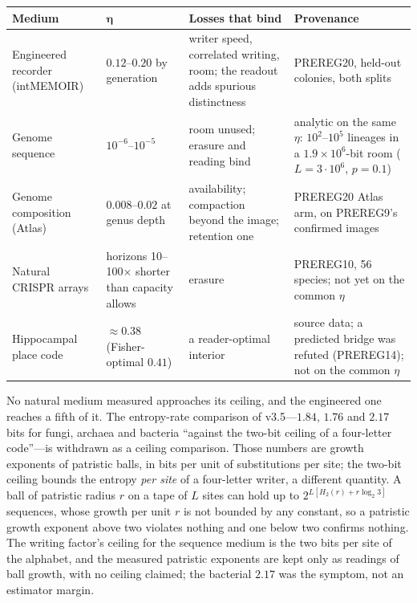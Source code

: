 \documentclass[11pt]{article}
\begin{document}
\begin{center}\small
\begin{tabular}{@{}>{\raggedright\arraybackslash}p{3.4cm}>{\raggedright\arraybackslash}p{2.6cm}>{\raggedright\arraybackslash}p{4.4cm}>{\raggedright\arraybackslash}p{3.6cm}@{}}
\toprule
\textbf{Medium} & $\boldsymbol\eta$ & \textbf{Losses that bind} & \textbf{Provenance} \\
\midrule
Engineered recorder (intMEMOIR) & $0.12$--$0.20$ by generation & writer speed, correlated writing, room; the readout adds spurious distinctness & PREREG20, held-out colonies, both splits \\
Genome sequence & $10^{-6}$--$10^{-5}$ & room unused; erasure and reading bind & analytic on the same $\eta$: $10^2$--$10^5$ lineages in a $1.9\times10^6$-bit room ($L=3\cdot10^6$, $p=0.1$) \\
Genome composition (Atlas) & $0.008$--$0.02$ at genus depth & availability; compaction beyond the image; retention one & PREREG20 Atlas arm, on PREREG9's confirmed images \\
Natural CRISPR arrays & horizons 10--100$\times$ shorter than capacity allows & erasure & PREREG10, 56 species; not yet on the common $\eta$ \\
Hippocampal place code & $\approx0.38$ (Fisher-optimal $0.41$) & a reader-optimal interior & 2025 source data; a predicted bridge was refuted (PREREG14); not on the common $\eta$ \\
\bottomrule
\end{tabular}
\end{center}

No natural medium measured approaches its ceiling, and the engineered one reaches a fifth of it. The entropy-rate comparison of v3.5---$1.84$, $1.76$ and $2.17$ bits for fungi, archaea and bacteria ``against the two-bit ceiling of a four-letter code''---is withdrawn as a ceiling comparison. Those numbers are growth exponents of patristic balls, in bits per unit of substitutions per site; the two-bit ceiling bounds the entropy \emph{per site} of a four-letter writer, a different quantity. A ball of patristic radius $r$ on a tape of $L$ sites can hold up to $2^{L[H_2(r)+r\log_2 3]}$ sequences, whose growth per unit $r$ is not bounded by any constant, so a patristic growth exponent above two violates nothing and one below two confirms nothing. The writing factor's ceiling for the sequence medium is the two bits per site of the alphabet, and the measured patristic exponents are kept only as readings of ball growth, with no ceiling claimed; the bacterial $2.17$ was the symptom, not an estimator margin.
\end{document}
